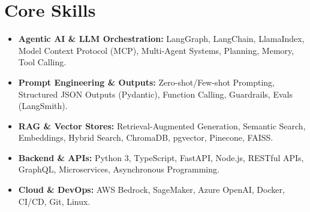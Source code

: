 \documentclass[a4paper,10pt]{article}
\begin{document}
\section{Core Skills}
\begin{itemize}
  \item \textbf{Agentic AI \& LLM Orchestration:} LangGraph, LangChain, LlamaIndex, Model Context Protocol (MCP), Multi-Agent Systems, Planning, Memory, Tool Calling.
  \item \textbf{Prompt Engineering \& Outputs:} Zero-shot/Few-shot Prompting, Structured JSON Outputs (Pydantic), Function Calling, Guardrails, Evals (LangSmith).
  \item \textbf{RAG \& Vector Stores:} Retrieval-Augmented Generation, Semantic Search, Embeddings, Hybrid Search, ChromaDB, pgvector, Pinecone, FAISS.
  \item \textbf{Backend \& APIs:} Python 3, TypeScript, FastAPI, Node.js, RESTful APIs, GraphQL, Microservices, Asynchronous Programming.
  \item \textbf{Cloud \& DevOps:} AWS Bedrock, SageMaker, Azure OpenAI, Docker, CI/CD, Git, Linux.
\end{itemize}
\end{document}
